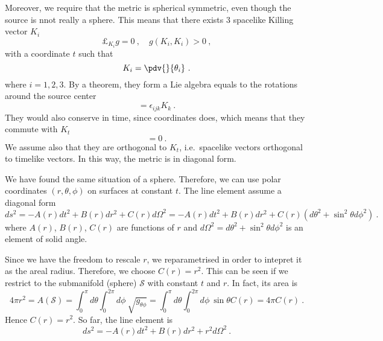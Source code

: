     Moreover, we require that the metric is spherical symmetric, even though the source is nnot really a sphere. This means that there exists $3$ spacelike Killing vector $K_{i}$ 
    \begin{equation*}
        \pounds_{K_{i}} g = 0~, \quad g(K_{i}, K_{i}) > 0 ~,
    \end{equation*}
    with a coordinate $t$ such that 
    \begin{equation*}
        K_{i} = \pdv{}{\theta_i} ~.
    \end{equation*}
    where $i = 1,2,3$. By a theorem, they form a Lie algebra equals to the rotations around the source center
    \begin{equation*}
        [K_i, K_j] = \epsilon_{ijk} K_k ~.
    \end{equation*}
    They would also conserve in time, since coordinates does, which means that they commute with $K_t$
    \begin{equation*}
        [K_i, K_t] = 0 ~.
    \end{equation*}
    We assume also that they are orthogonal to $K_t$, i.e.~spacelike vectors orthogonal to timelike vectors. In this way, the metric is in diagonal form. 

    We have found the same situation of a sphere. Therefore, we can use polar coordinates $(r, \theta, \phi)$ on surfaces at constant $t$. The line element assume a diagonal form 
    \begin{equation*}
        ds^2 = - A(r) dt^2 + B(r) dr^2 + C(r) d\Omega^2 = - A(r) dt^2 + B(r) dr^2 + C(r) (d\theta^2 + \sin^2 \theta d\phi^2) ~.
    \end{equation*}
    where $A(r)$, $B(r)$, $C(r)$ are functions of $r$ and $d \Omega^2 = d\theta^2 + \sin^2 \theta d\phi^2$ is an element of solid angle.

    Since we have the freedom to rescale $r$, we reparametrised in order to intepret it as the areal radius. Therefore, we choose $C(r) = r^2$. This can be seen if we restrict to the submanifold (sphere) $\mathcal S$ with constant $t$ and $r$. In fact, its area is 
    \begin{equation*}
        4\pi r^2 = A(\mathcal S) = \int_0^\pi d\theta \int_0^{2\pi} d\phi~ \sqrt{g_{\theta \phi}} = \int_0^\pi d\theta \int_0^{2\pi} d\phi~ \sin \theta C(r) = 4 \pi C(r) ~.
    \end{equation*}
    Hence $C(r) = r^2$. So far, the line element is 
    \begin{equation*}
        ds^2 = - A(r) dt^2 + B(r) dr^2 + r^2 d\Omega^2 ~.
    \end{equation*}

